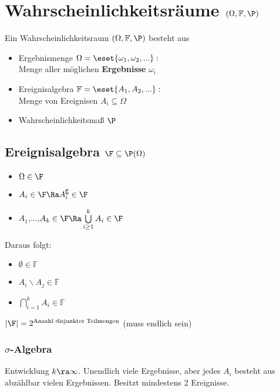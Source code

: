 \documentclass[german,color,6pt]{latex4ei/latex4ei_sheet}
\begin{document}
\section{Wahrscheinlichkeitsräume $(\Omega,\mathbb F,\P)$}
\begin{sectionbox}
	Ein Wahrscheinlichkeitsraum $(\Omega,\mathbb F,\P)$ besteht aus
	\begin{itemize}
		\item Ergebnismenge $\Omega = \eset{\omega_1,\omega_2, ...}:$\\
		Menge aller möglichen \textbf{Ergebnisse} $\omega_i$
		\item Ereignisalgebra $\mathbb F = \eset{A_1,A_2,...}:$\\
		Menge von Ereignisen $A_i \subseteq \Omega$
		\item Wahrscheinlichkeitsmaß $\P$
	\end{itemize}
\end{sectionbox}


\begin{sectionbox}
	\subsection{Ereignisalgebra $\F \subseteq \mathbb \P(\Omega)$}
	\begin{itemize}
		\item $\Omega \in \F$
		\item $A_i \in \F \Ra A_i^\complement \in \F$
		\item $A_1$,...,$A_k \in \F\Ra\bigcup\limits_{i \ge 1}^{k} A_i \in \F$
	\end{itemize}
	Daraus folgt:
	\begin{itemize}
		\item $\emptyset \in \mathbb F$
		\item $A_i \backslash A_j \in \mathbb F$
		\item $\bigcap_{i=1}^k A_i \in \mathbb F$
	\end{itemize}
	$|\F| = 2^{\text{Anzahl disjunkter Teilmengen}}$ (muss endlich sein)
	\subsubsection{$\sigma$-Algebra}
	Entwicklung $k \ra \infty$.
	Unendlich viele Ergebnisse, aber jedes $A_i$ besteht aus abzählbar vielen Ergebnissen. Besitzt mindestens 2 Ereignisse.
\end{sectionbox}
\end{document}
